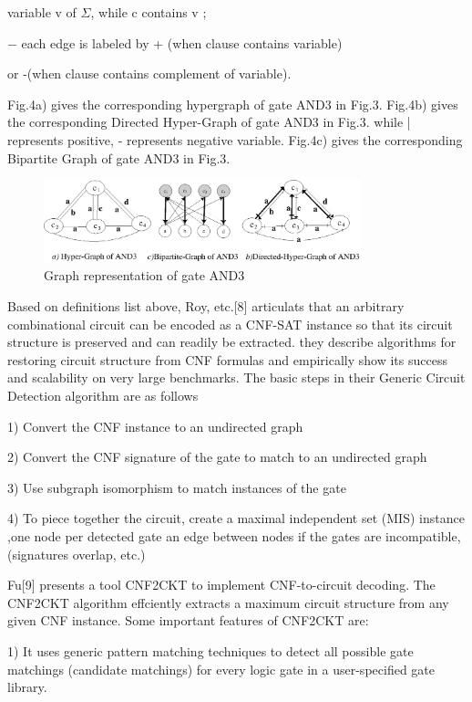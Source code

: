 \documentclass[runningheads,a4paper]{llncs}
\begin{document}
\setlength{\parindent}{5em}  variable v of $\Sigma$, while c contains v ;

\setlength{\parindent}{4em} $-$ each edge is labeled by + (when clause contains variable) 

\setlength{\parindent}{5em} or -(when clause contains complement of variable).

\setlength{\parindent}{2em} 

Fig.4a) gives the corresponding hypergraph of gate AND3 in Fig.3. 
Fig.4b) gives the corresponding Directed Hyper-Graph of gate AND3 in Fig.3. while | represents positive, - represents negative variable.
Fig.4c) gives the corresponding Bipartite Graph of gate AND3 in Fig.3.
\begin{figure}
\centering
\includegraphics[width=9.2cm]{a4}
\caption{Graph representation of gate AND3}
\end{figure}

Based on definitions list above, Roy, etc.[8] articulats that an arbitrary combinational circuit can be encoded as a CNF-SAT instance 
so that its circuit structure is preserved and can readily be extracted. 
they describe algorithms for restoring circuit structure from CNF formulas 
and empirically show its success and scalability on very large benchmarks. 
The basic steps in their Generic Circuit Detection algorithm are as follows 

1)	Convert the CNF instance to an undirected graph

2)	Convert the CNF signature of the gate to match to an undirected graph

3)	Use subgraph isomorphism to match instances of the gate

4)	To piece together the circuit, create a maximal independent set (MIS) instance ,one node per detected gate an edge between nodes if the gates are incompatible,(signatures overlap, etc.)

Fu[9] presents a tool CNF2CKT to implement CNF-to-circuit decoding. The CNF2CKT algorithm effciently extracts a maximum circuit structure from any given CNF instance. Some important features of CNF2CKT are:

1) It uses generic pattern matching techniques to detect all possible gate matchings (candidate matchings) for every logic gate in a user-specified gate library.
\end{document}
